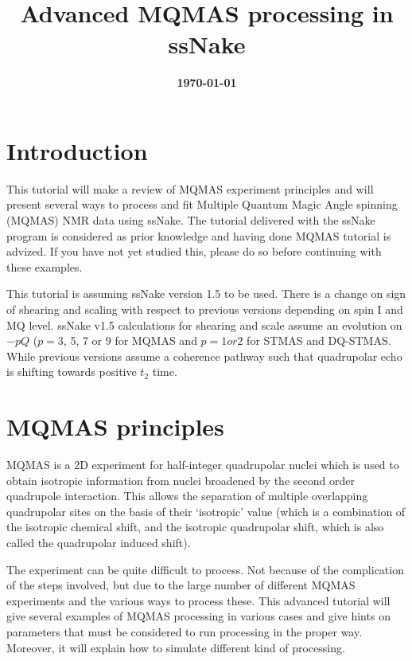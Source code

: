 \documentclass[11pt,a4paper]{article}
\title{\color{black}\fontfamily{SourceSansPro-LF}\bfseries Advanced MQMAS processing in ssNake}
\author{}
\date{\color{black}\fontfamily{SourceSansPro-LF}\bfseries \today}
\begin{document}

\maketitle

\section{Introduction}
This tutorial will make a review of MQMAS experiment principles and will present several ways to process and fit 
Multiple Quantum Magic Angle spinning (MQMAS) NMR data using ssNake.
The tutorial delivered with the ssNake program is considered as prior knowledge and having done MQMAS tutorial is advized.
If you have not yet studied this, please do so before continuing with these examples.

This tutorial is assuming ssNake version 1.5 to be used. There is a change on sign of shearing and scaling with respect to 
previous versions depending on spin I and MQ level. ssNake v1.5 calculations for shearing and scale assume an evolution on 
$-pQ$ ($p=$3, 5, 7 or 9 for MQMAS and $p= 1 or 2$ for STMAS and DQ-STMAS. While previous versions assume a coherence pathway 
such that quadrupolar echo is shifting towards positive $t_2$ time.

\section{MQMAS principles}
MQMAS is a 2D experiment for half-integer quadrupolar nuclei which is used to obtain isotropic information from nuclei 
broadened by the second order quadrupole interaction. This allows the separation of multiple overlapping quadrupolar 
sites on the basis of their `isotropic' value (which is a combination of the isotropic chemical shift, and the isotropic 
quadrupolar shift, which is also called the quadrupolar induced shift). 

The experiment can be quite difficult to process.
Not because of the complication of the steps involved, but due to the large number of different MQMAS experiments and the various ways to process these.
This advanced tutorial will give several examples of MQMAS processing in various cases and give hints on parameters that must be
considered to run processing in the proper way.
Moreover, it will explain how to simulate different kind of processing.
\end{document}
